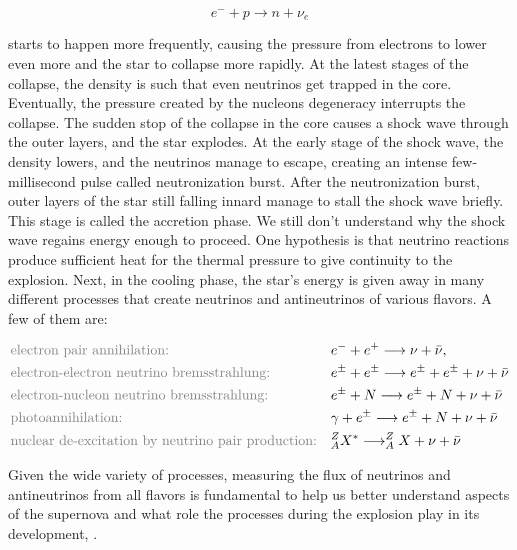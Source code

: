 \begin{equation}
    e^{-} + p \longrightarrow n + \nu_e
\end{equation}

starts to happen more frequently, causing the pressure from electrons to lower even more and the star to collapse more rapidly. At the latest stages of the collapse, the density is such that even neutrinos get trapped in the core. Eventually, the pressure created by the nucleons degeneracy interrupts the collapse. The sudden stop of the collapse in the core causes a shock wave through the outer layers, and the star explodes. At the early stage of the shock wave, the density lowers, and the neutrinos manage to escape, creating an intense few-millisecond pulse called neutronization burst. 
After the neutronization burst, outer layers of the star still falling innard manage to stall the shock wave briefly. This stage is called the accretion phase. We still don't understand why the shock wave regains energy enough to proceed. One hypothesis is that neutrino reactions produce sufficient heat for the thermal pressure to give continuity to the explosion. 
Next, in the cooling phase, the star's energy is given away in many different processes that create neutrinos and antineutrinos of various flavors. A few of them are:

\begin{align}
    & \text{{\color{gray} electron pair annihilation:}}
    && e^{-} + e^{+} \longrightarrow \nu + \bar{\nu}, \\
    & \text{{\color{gray}electron-electron neutrino bremsstrahlung:}}
    && e^{\pm} + e^{\pm} \longrightarrow e^{\pm} + e^{\pm} + \nu + \bar{\nu} \\
    & \text{{\color{gray}electron-nucleon neutrino bremsstrahlung:}}
    && e^{\pm} + N \longrightarrow e^{\pm} + N + \nu + \bar{\nu} \\
    & \text{{\color{gray}photoannihilation:}}
    && \gamma + e^{\pm} \longrightarrow e^{\pm} + N + \nu + \bar{\nu} \\
    & \text{{\color{gray}nuclear de-excitation by neutrino pair production:}} 
    && ^{Z}_{A}X^{*} \longrightarrow ^{Z}_{A}X + \nu + \bar{\nu}
\end{align}

Given the wide variety of processes, measuring the flux of neutrinos and antineutrinos from all flavors is fundamental to help us better understand aspects of the supernova and what role the processes during the explosion play in its development, \cite{Gardiner_thesis}. 

